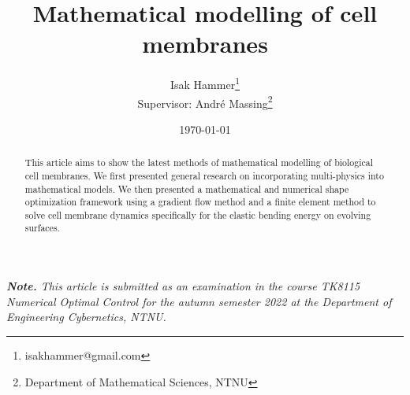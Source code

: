 \documentclass[10pt,conference]{IEEEtran}
\title{ {\Large \textbf{Mathematical modelling of cell membranes }} }
\author{Isak Hammer\footnote{isakhammer@gmail.com} \\{\small Supervisor: André Massing\footnote{Department of Mathematical Sciences, NTNU}} }
\date{\today}
\begin{document}
\maketitle
\begin{sloppy}
\textit{ \textbf{Note.} This article is submitted as an examination in the course TK8115 Numerical Optimal Control for the autumn semester 2022 at the Department of Engineering Cybernetics, NTNU. \\}


\begin{abstract}
This article aims to show the latest methods of mathematical modelling of biological cell membranes. We first presented general research on incorporating multi-physics into mathematical models. We then presented a mathematical and numerical shape optimization framework using a gradient flow method and a finite element method to solve cell membrane dynamics specifically for the elastic bending energy on evolving surfaces.
\end{abstract}

    
    
    
    
    

    \printbibliography
\end{sloppy}
\end{document}
